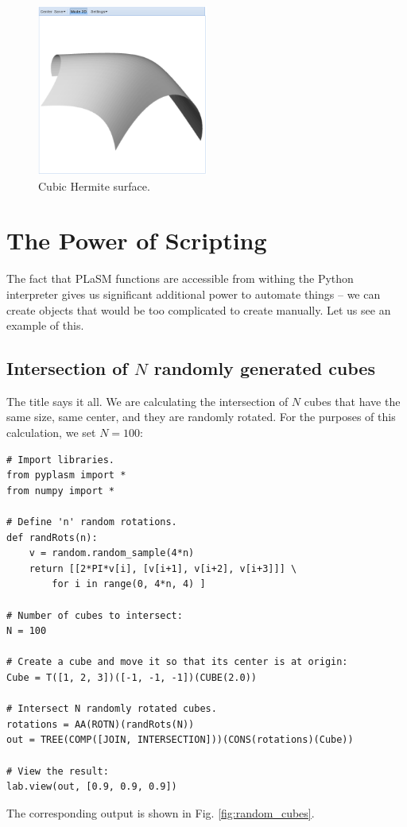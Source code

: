 \documentclass[article,A4,12pt]{llncs}
\begin{document}
\begin{figure}[!ht]
\begin{center}
\includegraphics[width=0.5\textwidth]{img/curves-14.png}
\end{center}
\vspace{-2mm}
\caption{Cubic Hermite surface.}
\label{fig:curves-14}
\end{figure}



\section{The Power of Scripting}

The fact that PLaSM functions are accessible from withing the Python 
interpreter gives us significant additional power to automate things 
-- we can create objects that would be too complicated to create manually. 
Let us see an example of this.

\subsection{Intersection of $N$ randomly generated cubes}

The title says it all. We are calculating the intersection of 
$N$ cubes that have the same size, same center, and they are 
randomly rotated. For the purposes of this calculation, we
set $N = 100$:

\begin{verbatim}
# Import libraries.
from pyplasm import *
from numpy import *

# Define 'n' random rotations.
def randRots(n):
    v = random.random_sample(4*n)
    return [[2*PI*v[i], [v[i+1], v[i+2], v[i+3]]] \
        for i in range(0, 4*n, 4) ]

# Number of cubes to intersect:
N = 100
  
# Create a cube and move it so that its center is at origin:
Cube = T([1, 2, 3])([-1, -1, -1])(CUBE(2.0))

# Intersect N randomly rotated cubes.
rotations = AA(ROTN)(randRots(N))
out = TREE(COMP([JOIN, INTERSECTION]))(CONS(rotations)(Cube))

# View the result:
lab.view(out, [0.9, 0.9, 0.9])
\end{verbatim}
\noindent
The corresponding output is shown in Fig. \ref{fig:random_cubes}.
\end{document}
